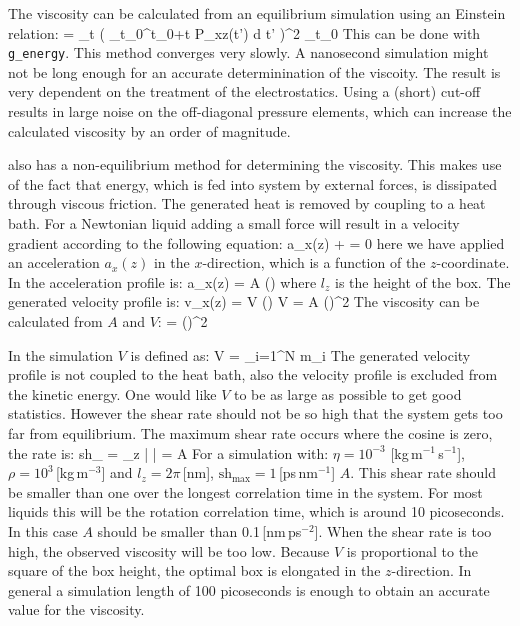 The viscosity can be calculated from an equilibrium simulation using
an Einstein relation:
\beq
\eta =  \lim_{t \rightarrow \infty}
 \left\langle 
\left( \int_{t_0}^{{t_0}+t} P_{xz}(t') \mbox{d} t' \right)^2
\right\rangle_{t_0}
\eeq
This can be done with {\tt g\_energy}.
This method converges very slowly. A nanosecond simulation might not
be long enough for an accurate determinination of the viscoity.
The result is very dependent on the treatment of the electrostatics.
Using a (short) cut-off results in large noise on the off-diagonal
pressure elements, which can increase the calculated viscosity by an order
of magnitude.

{\gromacs} also has a non-equilibrium method for determining the viscosity.
This makes use of the fact that energy, which is fed into system by
external forces, is dissipated through viscous friction. The generated heat
is removed by coupling to a heat bath. For a Newtonian liquid adding a 
small force will result in a velocity gradient according to the following
equation:
\beq
a_x(z) + \frac{\eta}{\rho}  = 0
\eeq
here we have applied an acceleration $a_x(z)$ in the $x$-direction, which
is a function of the $z$-coordinate.
In {\gromacs} the acceleration profile is:
\beq
a_x(z) = A \cos\left(\right)
\eeq
where $l_z$ is the height of the box. The generated velocity profile is:
\beq
v_x(z) = V \cos\left(\right)
\eeq
\beq
V = A \frac{\rho}{\eta}\left(\right)^2
\eeq
The viscosity can be calculated from $A$ and $V$:
\beq
\label{visc}
\eta = \rho \left(\right)^2
\eeq

In the simulation $V$ is defined as:
\beq
V = 
	 {\displaystyle \sum_{i=1}^N m_i}
\eeq
The generated velocity profile is not coupled to the heat bath, also
the velocity profile is excluded from the kinetic energy.
One would like $V$ to be as large as possible to get good statistics.
However the shear rate should not be so high that the system gets too far
from equilibrium. The maximum shear rate occurs where the cosine is zero,
the rate is:
\beq
\mbox{sh}_{\max} =  \max_z \left|  \right|
= A \frac{\rho}{\eta} 
\eeq
For a simulation with: $\eta=10^{-3}$ [kg\,m$^{-1}$\,s$^{-1}$],
$\rho=10^3$\,[kg\,m$^{-3}$] and $l_z=2\pi$\,[nm],
$\mbox{sh}_{\max}=1$\,[ps\,nm$^{-1}$] $A$.
This shear rate should be smaller than one over the longest
correlation time in the system. For most liquids this will be the rotation
correlation time, which is around 10 picoseconds. In this case $A$ should
be smaller than 0.1\,[nm\,ps$^{-2}$].
When the shear rate is too high, the observed viscosity will be too low.
Because $V$ is proportional to the square of the box height,
the optimal box is elongated in the $z$-direction.
In general a simulation length of 100 picoseconds is enough to obtain an
accurate value for the viscosity.

